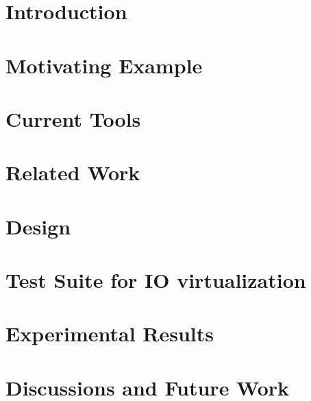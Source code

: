 \documentclass[10pt,onecolumn,oneside]{article}
\begin{document}
\onecolumn

\setcounter{page}{1}
\section{Introduction}

\newpage

\section{Motivating Example}

\newpage

\section{Current Tools}

\newpage

\section{Related Work}

\newpage

\section{Design}

\newpage

\section{Test Suite for IO virtualization}

\newpage

\section{Experimental Results}

\newpage

\section{Discussions and Future Work}

\newpage


\end{document}
